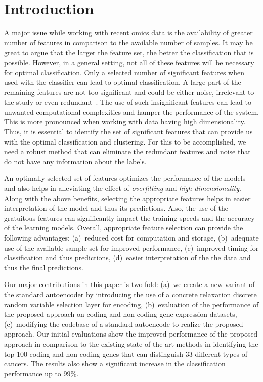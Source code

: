 \section{Introduction}

A major issue while working with recent omics data is the availability of greater number of features in comparison to the available number of samples. It may be great to argue that the larger the feature set, the better the classification that is possible. However, in a general setting, not all of these features will be necessary for optimal classification. Only a selected number of significant features when used with the classifier can lead to optimal classification. A large part of the remaining features are not too significant and could be either noise, irrelevant to the study or even redundant~\citep{pirgazi2019efficient}. The use of such insignificant features can lead to unwanted computational complexities and hamper the performance of the system. This is more pronounced when working with data having high dimensionality. Thus, it is essential to identify the set of significant features that can provide us with the optimal classification and clustering. For this to be accomplished, we need a robust method that can eliminate the redundant features and noise that do not have any information about the labels. 


An optimally selected set of features optimizes the performance of the models and also helps in alleviating the effect of \emph{overfitting} and \emph{high-dimensionality}. Along with the above benefits, selecting the appropriate features helps in easier interpretation of the model and thus its predictions. Also, the use of the gratuitous features can significantly impact the training speeds and the accuracy of the learning models. Overall, appropriate feature selection can provide the following advantages: (a)~reduced cost for computation and storage, (b)~adequate use of the available sample set for improved performance, (c)~improved timing for classification and thus predictions, (d)~easier interpretation of the the data and thus the final predictions. 


Our major contributions in this paper is two fold: (a)~we create a new variant of the standard autoencoder by introducing the use of a concrete relaxation discrete random variable selection layer for encoding, (b)~evaluation of the performance of the proposed approach on coding and non-coding gene expression datasets, (c)~modifying the codebase of a standard autoencode to realize the proposed approach. Our initial evaluations show the improved performance of the proposed approach in comparison to the existing state-of-the-art methods in identifying the top 100 coding and non-coding genes that can distinguish 33 different types of cancers.  
The results also show a significant increase in the classification performance up to 99\%.

